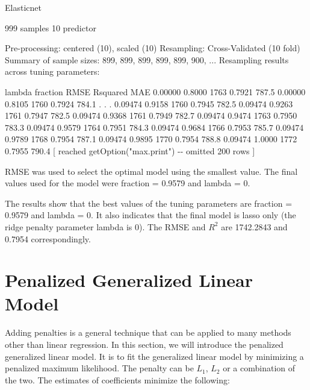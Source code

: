 \documentclass[
  12pt,
]{krantz}
\makeatletter
\newenvironment{Shaded}{\begin{snugshade}}{\end{snugshade}}
\newcommand{\NormalTok}[1]{#1}
\newenvironment{kframe}{%
\medskip{}
\setlength{\fboxsep}{.8em}
 \def\at@end@of@kframe{}%
 \ifinner\ifhmode%
  \def\at@end@of@kframe{\end{minipage}}%
  \begin{minipage}{\columnwidth}%
 \fi\fi%
 \def\FrameCommand##1{\hskip\@totalleftmargin \hskip-\fboxsep
 \colorbox{shadecolor}{##1}\hskip-\fboxsep
     \hskip-\linewidth \hskip-\@totalleftmargin \hskip\columnwidth}%
 \MakeFramed {\advance\hsize-\width
   \@totalleftmargin\z@ \linewidth\hsize
   \@setminipage}}%
 {\par\unskip\endMakeFramed%
 \at@end@of@kframe}
\renewenvironment{Shaded}{\begin{kframe}}{\end{kframe}}
\makeatother
\begin{document}
\begin{Shaded}
\begin{Highlighting}[]
\NormalTok{Elasticnet }

\NormalTok{999 samples}
\NormalTok{ 10 predictor}

\NormalTok{Pre{-}processing: centered (10), scaled (10) }
\NormalTok{Resampling: Cross{-}Validated (10 fold) }
\NormalTok{Summary of sample sizes: 899, 899, 899, 899, 899, 900, ... }
\NormalTok{Resampling results across tuning parameters:}

\NormalTok{  lambda   fraction  RMSE  Rsquared  MAE  }
\NormalTok{  0.00000  0.8000    1763  0.7921    787.5}
\NormalTok{  0.00000  0.8105    1760  0.7924    784.1}
\NormalTok{  .}
\NormalTok{  .}
\NormalTok{  .}
\NormalTok{  0.09474  0.9158    1760  0.7945    782.5}
\NormalTok{  0.09474  0.9263    1761  0.7947    782.5}
\NormalTok{  0.09474  0.9368    1761  0.7949    782.7}
\NormalTok{  0.09474  0.9474    1763  0.7950    783.3}
\NormalTok{  0.09474  0.9579    1764  0.7951    784.3}
\NormalTok{  0.09474  0.9684    1766  0.7953    785.7}
\NormalTok{  0.09474  0.9789    1768  0.7954    787.1}
\NormalTok{  0.09474  0.9895    1770  0.7954    788.8}
\NormalTok{  0.09474  1.0000    1772  0.7955    790.4}
\NormalTok{ [ reached getOption("max.print") {-}{-} omitted 200 rows ]}

\NormalTok{RMSE was used to select the optimal model using the smallest value.}
\NormalTok{The final values used for the model were fraction = 0.9579 and lambda = 0.}
\end{Highlighting}
\end{Shaded}

The results show that the best values of the tuning parameters are fraction = 0.9579 and lambda = 0. It also indicates that the final model is lasso only (the ridge penalty parameter lambda is 0). The RMSE and \(R^{2}\) are 1742.2843 and 0.7954 correspondingly.

\hypertarget{penalized-generalized-linear-model}{%
\section{Penalized Generalized Linear Model}\label{penalized-generalized-linear-model}}

Adding penalties is a general technique that can be applied to many methods other than linear regression. In this section, we will introduce the penalized generalized linear model. It is to fit the generalized linear model by minimizing a penalized maximum likelihood. The penalty can be \(L_1\), \(L_2\) or a combination of the two. The estimates of coefficients minimize the following:
\end{document}
